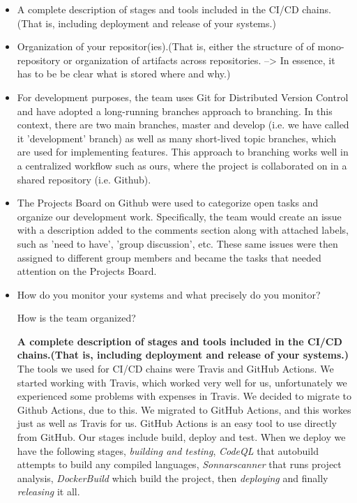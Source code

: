  
  \begin{itemize}
  \item A complete description of stages and tools included in the CI/CD chains.(That is, including deployment and release of your systems.)
  \item Organization of your repositor(ies).(That is, either the structure of of mono-repository or organization of artifacts across repositories. --> In essence, it has to be be clear what is stored where and why.) 
  \item For development purposes, the team uses Git for Distributed Version Control and have adopted a long-running branches approach to branching. In this context, there are two main branches, master and develop 
  (i.e. we have called it 'development' branch) as well as many short-lived topic branches, which are used for implementing features. This approach to branching works well in a centralized workflow such as ours, where the project is collaborated on in a shared
  repository (i.e. Github).
  \item The Projects Board on Github were used to categorize open tasks and organize our development work. Specifically, the team would create an issue with a description added to the comments section along
  with attached labels, such as 'need to have', 'group discussion', etc. These same issues were then assigned to different group members and became the tasks that needed attention on the Projects Board.
  
  \item How do you monitor your systems and what precisely do you monitor?

  How is the team organized?\newline
  
  \newline
  \textbf{A complete description of stages and tools included in the CI/CD chains.(That is, including deployment and release of your systems.)}\newline
  The tools we used for CI/CD chains were Travis and GitHub Actions. We started working with Travis, which worked very well for us, unfortunately we experienced some problems with expenses in Travis. We decided to migrate to Github Actions, due to this.
  We migrated to GitHub Actions, and this workes just as well as Travis for us. GitHub Actions is an easy tool to use directly from GitHub. 
  Our stages include build, deploy and test. When we deploy we have the following stages, \textit{building and testing}, \textit{CodeQL} that autobuild attempts to build any compiled languages, \textit{Sonnarscanner} that runs project analysis, \textit{DockerBuild} which build the project, then \textit{deploying} and finally \textit{releasing} it all.\newline


\end{itemize}
